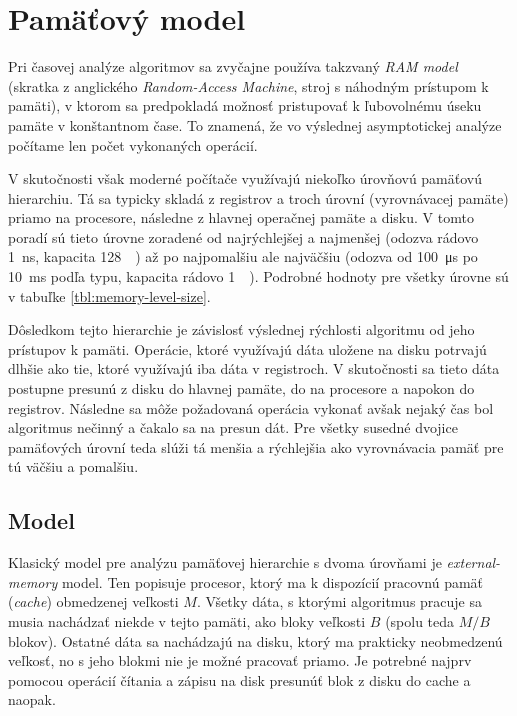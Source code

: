 \chapter{Pamäťový model}

Pri časovej analýze algoritmov sa zvyčajne používa takzvaný \emph{RAM model} (skratka z anglického \emph{Random-Access Machine}, stroj s náhodným prístupom k pamäti), v ktorom sa predpokladá možnosť pristupovať k ľubovolnému úseku pamäte v konštantnom čase. To znamená, že vo výslednej asymptotickej analýze počítame len počet vykonaných operácií.

V skutočnosti však moderné počítače využívajú niekoľko úrovňovú pamäťovú hierarchiu. Tá sa typicky skladá z registrov a troch úrovní \cache (vyrovnávacej pamäte) priamo na procesore, následne z hlavnej operačnej pamäte a disku. V tomto poradí sú tieto úrovne zoradené od najrýchlejšej a najmenšej (odozva rádovo \SI{1}{\nano\second}, kapacita \SI{128}{\kibi\byte}) až po najpomalšiu ale najväčšiu (odozva od \SI{100}{\micro\second} po \SI{10}{\milli\second} podľa typu, kapacita rádovo \SI{1}{\tebi\byte}). Podrobné hodnoty pre všetky úrovne sú v tabuľke \ref{tbl:memory-level-size}.



Dôsledkom tejto hierarchie je závislosť výslednej rýchlosti algoritmu od jeho prístupov k pamäti. Operácie, ktoré využívajú dáta uložene na disku potrvajú dlhšie ako tie, ktoré využívajú iba dáta v registroch. V skutočnosti sa tieto dáta postupne presunú z disku do hlavnej pamäte, do \cache na procesore a napokon do registrov. Následne sa môže požadovaná operácia vykonať avšak nejaký čas bol algoritmus nečinný a čakalo sa na presun dát. Pre všetky susedné dvojice pamäťových úrovní teda slúži tá menšia a rýchlejšia ako vyrovnávacia pamäť pre tú väčšiu a pomalšiu. 





\section{Model}
Klasický model pre analýzu pamäťovej hierarchie s dvoma úrovňami je {\em external-memory} model. Ten popisuje procesor, ktorý ma k dispozícií pracovnú pamäť ({\em cache}) obmedzenej veľkosti $M$. Všetky dáta, s ktorými algoritmus pracuje sa musia nachádzať niekde v tejto pamäti, ako bloky veľkosti $B$ (spolu teda $M/B$ blokov). Ostatné dáta sa nachádzajú na disku, ktorý ma prakticky neobmedzenú veľkosť, no s jeho blokmi nie je možné pracovať priamo. Je potrebné najprv pomocou operácií čítania a zápisu na disk presunúť blok z disku do cache a naopak.

